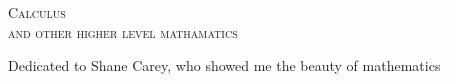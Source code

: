 \begin{titlepage}
    \begin{tcolorbox}[valign=center]
        {\begin{center}
        \hspace{0pt}
        \vfill
        \fontsize{45}{45}\scshape Calculus\\ 
        \fontsize{30}{30}\scshape and other higher level mathamatics
        \vfill
        \hspace{0pt}
        \end{center}}
    \end{tcolorbox}
\end{titlepage}

\newpage

\begin{center}
  \thispagestyle{empty}
  \vspace*{\fill}
  Dedicated to Shane Carey, who showed me the beauty of mathematics
  \vspace*{\fill}
\end{center}